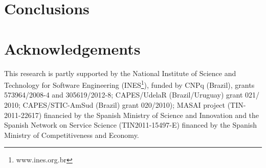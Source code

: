 \documentclass{llncs}
\theoremstyle{plain}
\theoremstyle{plain}
\theoremstyle{plain}
\begin{document}
\section{Conclusions}
\label{sec:conclusions}


\section*{Acknowledgements}
\small
This research is partly supported by the National Institute of Science and Technology for Software Engineering (INES\footnote{www.ines.org.br}), funded by CNPq (Brazil), grants 573964/2008-4 and 305619/2012-8; CAPES/UdelaR (Brazil/Uruguay) grant 021/ 2010; CAPES/STIC-AmSud (Brazil) grant 020/2010); MASAI project (TIN-2011-22617) financied by the Spanish Ministry of Science and Innovation and the Spanish Network on Service Science (TIN2011-15497-E) financed by the Spanish Ministry of Competitiveness and Economy. 
\normalsize
  

 
\end{document}
